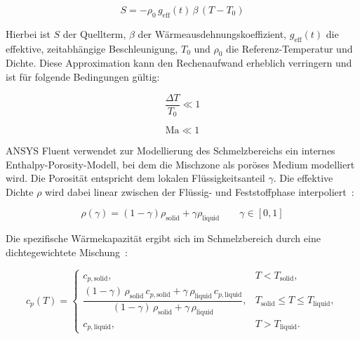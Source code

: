 \begin{equation}
  \label{eq:udf_bouss}
  S = -\rho_0 \, g_\text{eff}(t)\,\beta\,(T-T_0)
\end{equation}

Hierbei ist $S$ der Quellterm, $\beta$ der Wärmeausdehnungskoeffizient, $g_\text{eff}(t)$ die effektive, zeitabhängige Beschleunigung,
$T_0$ und $\rho_0$ die Referenz-Temperatur und Dichte. Diese Approximation kann den Rechenaufwand erheblich verringern und ist für folgende Bedingungen gültig:

\noindent\begin{minipage}{.5\linewidth}
  \begin{equation}
    \label{eq:bossinesque_bedingung1}
    \frac{\Delta T}{T_0} \ll 1
  \end{equation}
\end{minipage}%
\begin{minipage}{.5\linewidth}
  \begin{equation}
    \label{eq:bossinesque_bedingung2}
    \text{Ma} \ll 1
  \end{equation}
\end{minipage}

ANSYS Fluent verwendet zur Modellierung des Schmelzbereichs ein internes Enthalpy-Porosity-Modell, bei dem die Mischzone als poröses Medium modelliert wird.
Die Porosität entspricht dem lokalen Flüssigkeitsanteil $\gamma$. Die effektive Dichte $\rho$ wird dabei linear zwischen der Flüssig- und Feststoffphase interpoliert~\cite{akamcae-udf}:

\begin{equation}
  \label{eq:udf_dichte}
  \rho(\gamma) = \left(1- \gamma\right) \rho_\text{solid} + \gamma \rho_\text{liquid} \qquad \gamma \in [0,1]
\end{equation}

Die spezifische Wärmekapazität ergibt sich im Schmelzbereich durch eine dichtegewichtete Mischung~\cite{akamcae-udf}:

\begin{equation}
  \label{eq:udf_cp}
    c_p(T)=
  \begin{cases}
    c_{p,\mathrm{solid}}, & T < T_\mathrm{solid},\\[6pt]
    \dfrac{(1-\gamma)\,\rho_\mathrm{solid}\,c_{p,\mathrm{solid}} + \gamma\,\rho_\mathrm{liquid}\,c_{p,\mathrm{liquid}}}
          {(1-\gamma)\,\rho_\mathrm{solid} + \gamma\,\rho_\mathrm{liquid}}, & T_\mathrm{solid} \le T \le T_\mathrm{liquid},\\[12pt]
    c_{p,\mathrm{liquid}}, & T > T_\mathrm{liquid}.
  \end{cases}
\end{equation}

